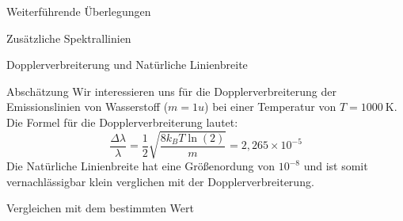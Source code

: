 \documentclass[pdftex, a4paper,11pt, twoside, ngerman]{report}
\begin{document}
  
  
  \begin{chapter}{Weiterführende Überlegungen}
    \label{chp:Weiterfuehrendes}
    
    
    
    \begin{section}{Zusätzliche Spektrallinien}
      \label{chp:Weiterfuehrendes:sec:Spektrallinien}
      
      
      
    \end{section}
    
    
    
    \begin{section}{Dopplerverbreiterung und Natürliche Linienbreite}
      \label{chp:Weiterfuehrendes:sec:Linienbreite}
      
      
      
      \begin{subsection}{Abschätzung}
        \label{chp:Weiterfuehrendes:sec:Linienbreite:subsec:Abschaetzung}
        Wir interessieren uns für die Dopplerverbreiterung der Emissionslinien 
        von Wasserstoff ($m=1u$) bei einer Temperatur von 
        $T=\SI{1000}{\kelvin}$. Die Formel für die Dopplerverbreiterung lautet:
        \[
          \frac{\Delta\lambda}{\lambda} = \frac 12\sqrt{\frac{8k_BT\ln(2)}{m}} 
          = 2,265\times10^{-5}
        \]
        Die Natürliche Linienbreite hat eine Größenordung von $10^{-8}$ und 
        ist somit vernachlässigbar klein verglichen mit der 
        Dopplerverbreiterung.
        
      \end{subsection}
      
      
      
      \begin{subsection}{Vergleichen mit dem bestimmten Wert}
        \label{chp:Weiterfuehrendes:sec:Linienbreite:subsec:Vergleiche}
        
        
        
      \end{subsection}
   
    \end{section}
    
    
    
   
  
  \end{chapter}
\end{document}
